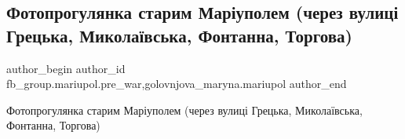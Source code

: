  
 
 
 
 

\subsection{Фотопрогулянка старим Маріуполем  (через вулиці Грецька, Миколаївська, Фонтанна, Торгова)}
\label{sec:12_03_2023.fb.fb_group.mariupol.pre_war.1.fotoprogulyanka_star}
 
\ifcmt
 author_begin
   author_id fb_group.mariupol.pre_war,golovnjova_maryna.mariupol
 author_end
\fi

Фотопрогулянка старим Маріуполем (через вулиці Грецька, Миколаївська, Фонтанна, Торгова)

